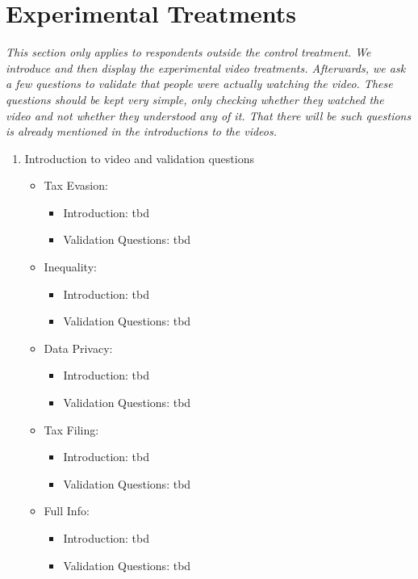 \documentclass[11pt]{article}
\begin{document}
\section*{Experimental Treatments}
\textit{This section only applies to respondents outside the control treatment. We introduce and then display the experimental video treatments. Afterwards, we ask a few questions to validate that people were actually watching the video. These questions should be kept very simple, only checking whether they watched the video and not whether they understood any of it. That there will be such questions is already mentioned in the introductions to the videos.}
\begin{enumerate}[resume]
    \item Introduction to video and validation questions
    \begin{itemize}
        \item Tax Evasion:
        \begin{itemize}
            \item Introduction: tbd
            \item Validation Questions: tbd
        \end{itemize}
        \item Inequality: 
        \begin{itemize}
            \item Introduction: tbd
            \item Validation Questions: tbd
        \end{itemize}
        \item Data Privacy:
        \begin{itemize}
            \item Introduction: tbd
            \item Validation Questions: tbd
        \end{itemize}
        \item Tax Filing:
        \begin{itemize}
            \item Introduction: tbd
            \item Validation Questions: tbd
        \end{itemize}
        \item Full Info:
        \begin{itemize}
            \item Introduction: tbd
            \item Validation Questions: tbd
        \end{itemize}
    \end{itemize}
\end{enumerate}
\end{document}
